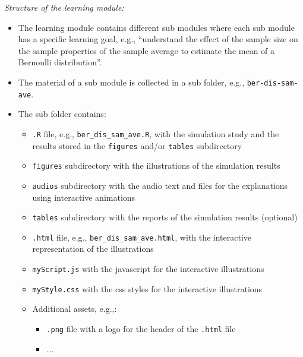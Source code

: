 \documentclass{article}
\begin{document}
\emph{Structure of the learning module:}

\begin{itemize}
	\item The learning module contains different sub modules where each sub module has a specific learning goal, e.g., ``understand the effect of the sample size on the sample properties of the sample average to estimate the mean of a Bernoulli distribution''.
	\item The material of a sub module is collected in a sub folder, e.g., \texttt{ber-dis-sam-ave}.
	\item The sub folder contains:
	\begin{itemize}
		\item \texttt{.R} file, e.g., \texttt{ber\_dis\_sam\_ave.R}, with the simulation study and the results stored in the \texttt{figures} and/or \texttt{tables} subdirectory
		\item \texttt{figures} subdirectory with the illustrations of the simulation results
		\item \texttt{audios} subdirectory with the audio text and files for the explanations using interactive animations
		\item \texttt{tables} subdirectory with the reports of the simulation results (optional)
		\item \texttt{.html} file, e.g., \texttt{ber\_dis\_sam\_ave.html}, with the interactive representation of the illustrations
		\item \texttt{myScript.js} with the javascript for the interactive illustrations
		\item \texttt{myStyle.css} with the css styles for the interactive illustrations
		\item Additional assets, e.g.,:
		\begin{itemize}
			\item \texttt{.png} file with a logo for the header of the \texttt{.html} file
			\item ...
		\end{itemize}
	\end{itemize}
\end{itemize}





	
\end{document}
